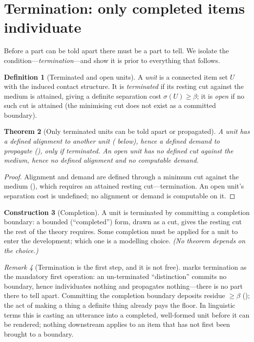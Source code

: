 \documentclass[twocolumn,11pt,a4paper]{article}
\theoremstyle{sup}
\newtheorem{theorem}{Theorem}[section]
\theoremstyle{definition}
\newtheorem{definition}[theorem]{Definition}
\newtheorem{construction}[theorem]{Construction}
\theoremstyle{remark}
\newtheorem{remark}[theorem]{Remark}
\newcommand{\flo}{\beta}
\newcommand{\str}{\sigma}
\begin{document}
\section{Termination: only completed items individuate}
\label{sec:termination}

Before a part can be told apart there must be a part to tell. We isolate the
condition---\emph{termination}---and show it is prior to everything that
follows.

\begin{definition}[Terminated and open units]
\label{def:terminated}
A \emph{unit} is a connected item set $U$ with the induced contact structure. It
is \emph{terminated} if its resting cut against the medium is attained, giving a
definite separation cost $\str(U)\ge\flo$; it is \emph{open} if no such cut is
attained (the minimising cut does not exist as a committed boundary).
\end{definition}

\begin{theorem}[Only terminated units can be told apart or propagated]
\label{thm:terminate}
A unit has a defined alignment to another unit ( below),
hence a defined demand to propagate (), only if terminated. An
open unit has no defined cut against the medium, hence no defined alignment and
no computable demand.
\end{theorem}

\begin{proof}
Alignment and demand are defined through a minimum cut against the medium
(), which requires an attained resting
cut---termination. An open unit's separation cost is undefined; no alignment or
demand is computable on it.
\end{proof}

\begin{construction}[Completion]
\label{con:completion}
A unit is terminated by committing a completion boundary: a bounded
(``completed'') form, drawn as a cut, gives the resting cut the rest of the
theory requires. Some completion must be applied for a unit to enter the
development; which one is a modelling choice. \textit{(No theorem depends on the
choice.)}
\end{construction}

\begin{remark}[Termination is the first step, and it is not free]
\label{rem:first-step}
 marks termination as the mandatory first operation: an
un-terminated ``distinction'' commits no boundary, hence individuates nothing
and propagates nothing---there is no part there to tell apart. Committing the
completion boundary deposits residue $\ge\flo$ (); the act of
making a thing a definite thing already pays the floor. In linguistic terms this
is casting an utterance into a completed, well-formed unit before it can be
rendered; nothing downstream applies to an item that has not first been brought
to a boundary.
\end{remark}
\end{document}
